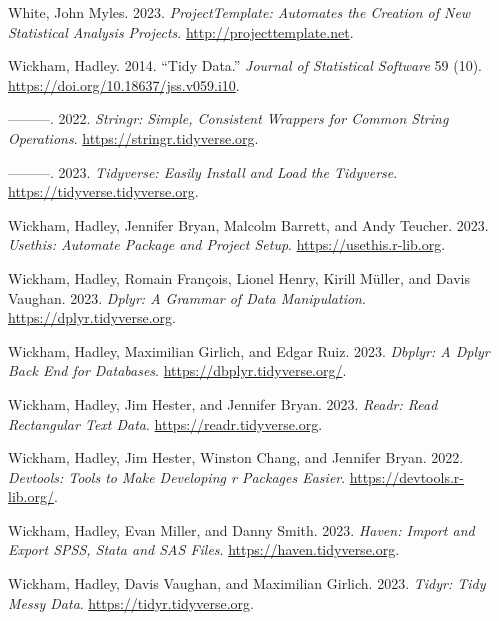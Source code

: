 \documentclass[
  letterpaper,
  DIV=11,
  numbers=noendperiod]{scrreport}
\newlength{\cslhangindent}
\newlength{\cslentryspacingunit} %
\newenvironment{CSLReferences}[2] %
 {%
  \setlength{\parindent}{0pt}
  \ifodd #1
  \let\oldpar\par
  \def\par{\hangindent=\cslhangindent\oldpar}
  \fi
  \setlength{\parskip}{#2\cslentryspacingunit}
 }%
 {}
\theoremstyle{definition}
\theoremstyle{remark}
\begin{document}
\begin{CSLReferences}{1}{0}
\leavevmode{}%
White, John Myles. 2023. \emph{ProjectTemplate: Automates the Creation
of New Statistical Analysis Projects}. \url{http://projecttemplate.net}.

\leavevmode{}%
Wickham, Hadley. 2014. {``Tidy Data.''} \emph{Journal of Statistical
Software} 59 (10). \url{https://doi.org/10.18637/jss.v059.i10}.

\leavevmode{}%
---------. 2022. \emph{Stringr: Simple, Consistent Wrappers for Common
String Operations}. \url{https://stringr.tidyverse.org}.

\leavevmode{}%
---------. 2023. \emph{Tidyverse: Easily Install and Load the
Tidyverse}. \url{https://tidyverse.tidyverse.org}.

\leavevmode{}%
Wickham, Hadley, Jennifer Bryan, Malcolm Barrett, and Andy Teucher.
2023. \emph{Usethis: Automate Package and Project Setup}.
\url{https://usethis.r-lib.org}.

\leavevmode{}%
Wickham, Hadley, Romain François, Lionel Henry, Kirill Müller, and Davis
Vaughan. 2023. \emph{Dplyr: A Grammar of Data Manipulation}.
\url{https://dplyr.tidyverse.org}.

\leavevmode{}%
Wickham, Hadley, Maximilian Girlich, and Edgar Ruiz. 2023. \emph{Dbplyr:
A Dplyr Back End for Databases}. \url{https://dbplyr.tidyverse.org/}.

\leavevmode{}%
Wickham, Hadley, Jim Hester, and Jennifer Bryan. 2023. \emph{Readr: Read
Rectangular Text Data}. \url{https://readr.tidyverse.org}.

\leavevmode{}%
Wickham, Hadley, Jim Hester, Winston Chang, and Jennifer Bryan. 2022.
\emph{Devtools: Tools to Make Developing r Packages Easier}.
\url{https://devtools.r-lib.org/}.

\leavevmode{}%
Wickham, Hadley, Evan Miller, and Danny Smith. 2023. \emph{Haven: Import
and Export SPSS, Stata and SAS Files}.
\url{https://haven.tidyverse.org}.

\leavevmode{}%
Wickham, Hadley, Davis Vaughan, and Maximilian Girlich. 2023.
\emph{Tidyr: Tidy Messy Data}. \url{https://tidyr.tidyverse.org}.


\end{CSLReferences}
\end{document}
